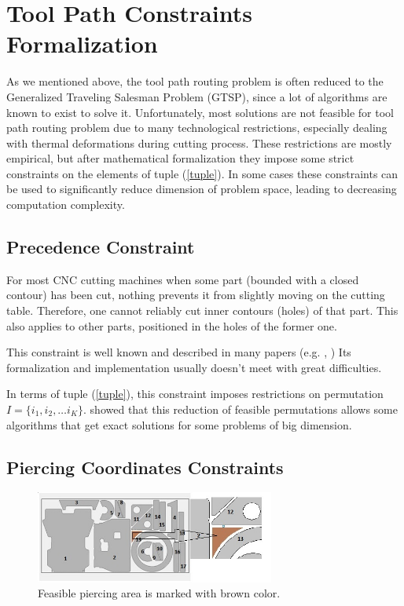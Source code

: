 \documentclass{../download/tPRS2e}
\begin{document}
\section{Tool Path Constraints Formalization}

As we mentioned above,
the tool path routing problem is often reduced to the Generalized Traveling Salesman Problem (GTSP),
since a lot of algorithms are known to exist to solve it.
Unfortunately, most solutions are not feasible for tool path routing problem due to many technological restrictions,
especially dealing with thermal deformations during cutting process.
These restrictions are mostly empirical,
but after mathematical formalization they impose some strict constraints on the elements of tuple (\ref{tuple}).
In some cases these constraints can be used to significantly reduce dimension of problem space,
leading to decreasing computation complexity.

\subsection{Precedence Constraint}

For most CNC cutting machines when some part (bounded with a closed contour) has been cut,
nothing prevents it from slightly moving on the cutting table.
Therefore, one cannot reliably cut inner contours (holes) of that part.
This also applies to other parts, positioned in the holes of the former one.

This constraint is well known and described in many papers
(e.g. \cite{verkhoturov_mathematical_2008}, 
\cite{dewil_cutting_2011})
Its formalization and implementation usually doesn’t meet with great difficulties.

In terms of tuple (\ref{tuple}),
this constraint imposes restrictions on permutation 
$I = \{i_1, i_2, \dots i_K\}$.
\cite{petunin_local_2014}
showed that this reduction of feasible permutations allows some algorithms that get exact solutions for some problems of big dimension.

\subsection{Piercing Coordinates Constraints}

\begin{figure}
\begin{center}
\includegraphics[width=0.7\textwidth]{ppc.jpeg}
\caption{Feasible piercing area is marked with brown color.} \label{piercing-area}
\end{center}
\end{figure}
\end{document}
